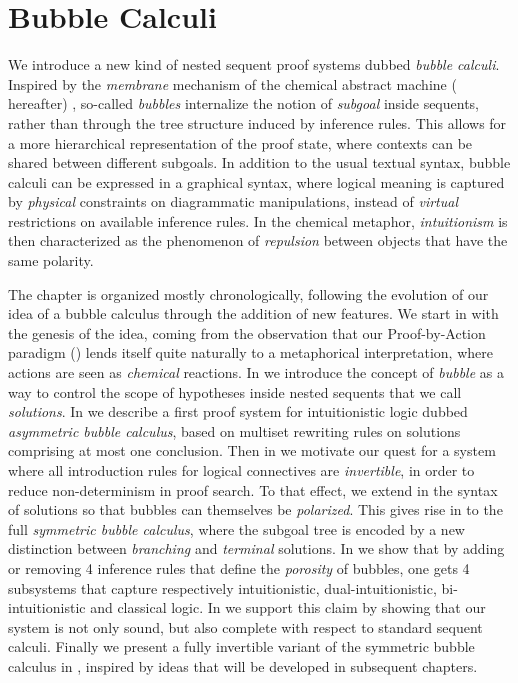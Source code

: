 \setchapterpreamble[u]{\margintoc}
\chapter{Bubble Calculi}

We introduce a new kind of nested sequent proof systems dubbed \emph{bubble
calculi}. Inspired by the \emph{membrane} mechanism of the chemical abstract
machine ({\cham} hereafter) , so-called
\emph{bubbles} internalize the notion of \emph{subgoal} inside sequents, rather
than through the tree structure induced by inference rules. This allows for a
more hierarchical representation of the proof state, where contexts can be
shared between different subgoals. In addition to the usual textual syntax,
bubble calculi can be expressed in a graphical syntax, where logical meaning is
captured by \emph{physical} constraints on diagrammatic manipulations, instead
of \emph{virtual} restrictions on available inference rules. In the chemical
metaphor, \emph{intuitionism} is then characterized as the phenomenon of
\emph{repulsion} between objects that have the same polarity.

The chapter is organized mostly chronologically, following the evolution of our
idea of a bubble calculus through the addition of new features. We start in
 with the genesis of the idea, coming from the observation that
our Proof-by-Action paradigm () lends itself quite naturally to a
metaphorical interpretation, where actions are seen as \emph{chemical}
reactions. In  we introduce the concept of \emph{bubble} as a
way to control the scope of hypotheses inside nested sequents that we call
\emph{solutions}. In  we describe a first proof system for
intuitionistic logic dubbed \emph{asymmetric bubble calculus}, based on multiset
rewriting rules on solutions comprising at most one conclusion. Then in
 we motivate our quest for a system where all
introduction rules for logical connectives are \emph{invertible}, in order to
reduce non-determinism in proof search. To that effect, we extend in
 the syntax of solutions so that bubbles can themselves be
\emph{polarized}. This gives rise in  to the full
\emph{symmetric bubble calculus}, where the subgoal tree is encoded by a new
distinction between \emph{branching} and \emph{terminal} solutions. In
 we show that by adding or removing 4 inference rules
that define the \emph{porosity} of bubbles, one gets 4 subsystems that capture
respectively intuitionistic, dual-intuitionistic, bi-intuitionistic and
classical logic. In  we support this claim by
showing that our system is not only sound, but also complete with respect to
standard sequent calculi. Finally we present a fully invertible variant of the
symmetric bubble calculus in , inspired by ideas
that will be developed in subsequent chapters.


